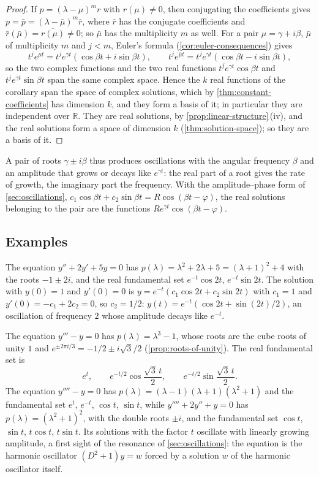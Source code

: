 \begin{proof}
If $p=(\lambda-\mu)^mr$ with $r(\mu)\ne0$, then conjugating the coefficients gives $p=\bar p=(\lambda-\bar\mu)^m\bar r$, where $\bar r$ has the conjugate coefficients and $\bar r(\bar\mu)=\overline{r(\mu)}\ne0$; so $\bar\mu$ has the multiplicity $m$ as well. For a pair $\mu=\gamma+i\beta$, $\bar\mu$ of multiplicity $m$ and $j<m$, Euler's formula (\cref{cor:euler-consequences}) gives
\[
t^je^{\mu t}=t^je^{\gamma t}(\cos\beta t+i\sin\beta t),\qquad t^je^{\bar\mu t}=t^je^{\gamma t}(\cos\beta t-i\sin\beta t),
\]
so the two complex functions and the two real functions $t^je^{\gamma t}\cos\beta t$ and $t^je^{\gamma t}\sin\beta t$ span the same complex space. Hence the $k$ real functions of the corollary span the space of complex solutions, which by \cref{thm:constant-coefficients} has dimension $k$, and they form a basis of it; in particular they are independent over $\mathbb R$. They are real solutions, by \cref{prop:linear-structure}\,(iv), and the real solutions form a space of dimension $k$ (\cref{thm:solution-space}); so they are a basis of it.
\end{proof}

A pair of roots $\gamma\pm i\beta$ thus produces oscillations with the angular frequency $\beta$ and an amplitude that grows or decays like $e^{\gamma t}$: the real part of a root gives the rate of growth, the imaginary part the frequency. With the amplitude--phase form of \cref{sec:oscillations}, $c_1\cos\beta t+c_2\sin\beta t=R\cos(\beta t-\varphi)$, the real solutions belonging to the pair are the functions $Re^{\gamma t}\cos(\beta t-\varphi)$.

\subsection{Examples}

The equation $y''+2y'+5y=0$ has $p(\lambda)=\lambda^2+2\lambda+5=(\lambda+1)^2+4$ with the roots $-1\pm2i$, and the real fundamental set $e^{-t}\cos2t$, $e^{-t}\sin2t$. The solution with $y(0)=1$ and $y'(0)=0$ is $y=e^{-t}(c_1\cos2t+c_2\sin2t)$ with $c_1=1$ and $y'(0)=-c_1+2c_2=0$, so $c_2=1/2$: $y(t)=e^{-t}(\cos2t+\sin(2t)/2)$, an oscillation of frequency $2$ whose amplitude decays like $e^{-t}$.

The equation $y'''-y=0$ has $p(\lambda)=\lambda^3-1$, whose roots are the cube roots of unity $1$ and $e^{\pm2\pi i/3}=-1/2\pm i\sqrt3/2$ (\cref{prop:roots-of-unity}). The real fundamental set is
\[
e^t,\qquad e^{-t/2}\cos\frac{\sqrt3\,t}2,\qquad e^{-t/2}\sin\frac{\sqrt3\,t}2 .
\]
The equation $y''''-y=0$ has $p(\lambda)=(\lambda-1)(\lambda+1)(\lambda^2+1)$ and the fundamental set $e^t$, $e^{-t}$, $\cos t$, $\sin t$, while $y''''+2y''+y=0$ has $p(\lambda)=(\lambda^2+1)^2$, with the double roots $\pm i$, and the fundamental set $\cos t$, $\sin t$, $t\cos t$, $t\sin t$. Its solutions with the factor $t$ oscillate with linearly growing amplitude, a first sight of the resonance of \cref{sec:oscillations}: the equation is the harmonic oscillator $(D^2+1)y=w$ forced by a solution $w$ of the harmonic oscillator itself.

